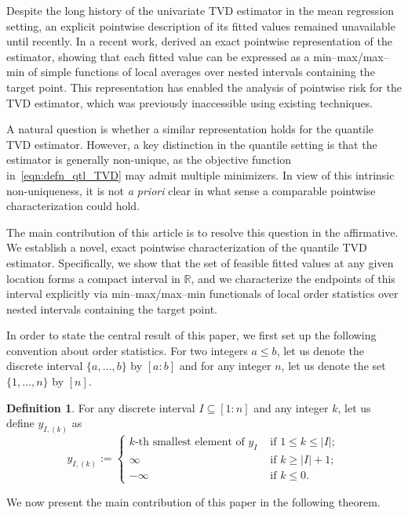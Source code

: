 \documentclass[11pt]{article}
\theoremstyle{plain}
\theoremstyle{definition}
\newtheorem{definition}[theorem]{Definition}
\theoremstyle{remark}
\begin{document}
Despite the long history of the univariate TVD estimator in the mean regression setting, an explicit pointwise description of its fitted values remained unavailable until recently. In a recent work, \cite{chatterjee2026minmaxtrendfilteringgeneralizations} derived an exact pointwise representation of the estimator, showing that each fitted value can be expressed as a min--max/max--min of simple functions of local averages over nested intervals containing the target point. This representation has enabled the analysis of pointwise risk for the TVD estimator, which was previously inaccessible using existing techniques.

A natural question is whether a similar representation holds for the quantile TVD estimator. However, a key distinction in the quantile setting is that the estimator is generally non-unique, as the objective function in~\eqref{eqn:defn_qtl_TVD} may admit multiple minimizers. In view of this intrinsic non-uniqueness, it is not \emph{a priori} clear in what sense a comparable pointwise characterization could hold.

The main contribution of this article is to resolve this question in the affirmative. We establish a novel, exact pointwise characterization of the quantile TVD estimator. Specifically, we show that the set of feasible fitted values at any given location forms a compact interval in $\mathbb{R}$, and we characterize the endpoints of this interval explicitly via min--max/max--min functionals of local order statistics over nested intervals containing the target point.
 
 
 In order to state the central result of this paper, we first set up the following convention about order statistics. For two integers $a\leq b$, let us denote the discrete interval $\{a,\ldots,b\}$ by $[a:b]$ and for any integer $n$, let us denote the set $\{1,\ldots,n\}$ by $[n]$.  

\begin{definition}\label{defn:Y_I,k}
    For any discrete interval $I \subseteq [1:n]$ and any integer $k$, let us define $y_{I,(k)}$ as
    \[y_{I,(k)}:=\begin{cases}
     k\text{-th smallest element of }y_I & \text{ if } 1\leq k \leq |I|;\\
     \infty & \text{ if } k\geq |I|+1;\\
     -\infty & \text{ if } k\leq 0.
 \end{cases}\]
\end{definition}

We now present the main contribution of this paper in the following theorem.
\end{document}
